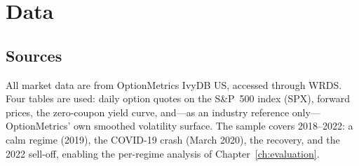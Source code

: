 \chapter{Data}\label{ch:data}

\section{Sources}
All market data are from OptionMetrics IvyDB US, accessed through WRDS. Four tables are used: daily option quotes on the S\&P~500 index (SPX), forward prices, the zero-coupon yield curve, and---as an industry reference only---OptionMetrics' own smoothed volatility surface. The sample covers 2018--2022: a calm regime (2019), the COVID-19 crash (March 2020), the recovery, and the 2022 sell-off, enabling the per-regime analysis of Chapter~\ref{ch:evaluation}.

